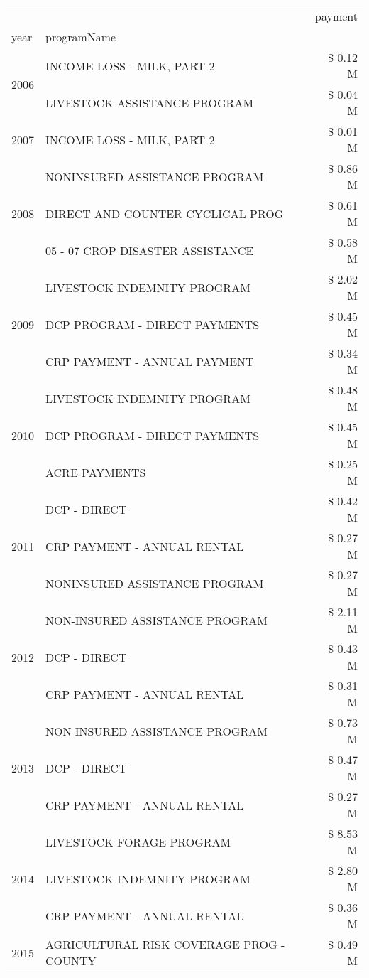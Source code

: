 \begin{tabular}{llr}
\toprule
 &  & payment \\
year & programName &  \\
\midrule
\multirow[t]{2}{*}{2006} & INCOME LOSS - MILK, PART 2 & \$ 0.12 M \\
 & LIVESTOCK ASSISTANCE PROGRAM & \$ 0.04 M \\
\cline{1-3}
2007 & INCOME LOSS - MILK, PART 2 & \$ 0.01 M \\
\cline{1-3}
\multirow[t]{3}{*}{2008} & NONINSURED ASSISTANCE PROGRAM & \$ 0.86 M \\
 & DIRECT AND COUNTER CYCLICAL PROG & \$ 0.61 M \\
 & 05 - 07 CROP DISASTER ASSISTANCE & \$ 0.58 M \\
\cline{1-3}
\multirow[t]{3}{*}{2009} & LIVESTOCK INDEMNITY PROGRAM & \$ 2.02 M \\
 & DCP PROGRAM - DIRECT PAYMENTS & \$ 0.45 M \\
 & CRP PAYMENT - ANNUAL PAYMENT & \$ 0.34 M \\
\cline{1-3}
\multirow[t]{3}{*}{2010} & LIVESTOCK INDEMNITY PROGRAM & \$ 0.48 M \\
 & DCP PROGRAM - DIRECT PAYMENTS & \$ 0.45 M \\
 & ACRE PAYMENTS & \$ 0.25 M \\
\cline{1-3}
\multirow[t]{3}{*}{2011} & DCP - DIRECT & \$ 0.42 M \\
 & CRP PAYMENT - ANNUAL RENTAL & \$ 0.27 M \\
 & NONINSURED ASSISTANCE PROGRAM & \$ 0.27 M \\
\cline{1-3}
\multirow[t]{3}{*}{2012} & NON-INSURED ASSISTANCE PROGRAM & \$ 2.11 M \\
 & DCP - DIRECT & \$ 0.43 M \\
 & CRP PAYMENT - ANNUAL RENTAL & \$ 0.31 M \\
\cline{1-3}
\multirow[t]{3}{*}{2013} & NON-INSURED ASSISTANCE PROGRAM & \$ 0.73 M \\
 & DCP - DIRECT & \$ 0.47 M \\
 & CRP PAYMENT - ANNUAL RENTAL & \$ 0.27 M \\
\cline{1-3}
\multirow[t]{3}{*}{2014} & LIVESTOCK FORAGE PROGRAM & \$ 8.53 M \\
 & LIVESTOCK INDEMNITY PROGRAM & \$ 2.80 M \\
 & CRP PAYMENT - ANNUAL RENTAL & \$ 0.36 M \\
\cline{1-3}
\multirow[t]{3}{*}{2015} & AGRICULTURAL RISK COVERAGE PROG - COUNTY & \$ 0.49 M \\

\end{tabular}
